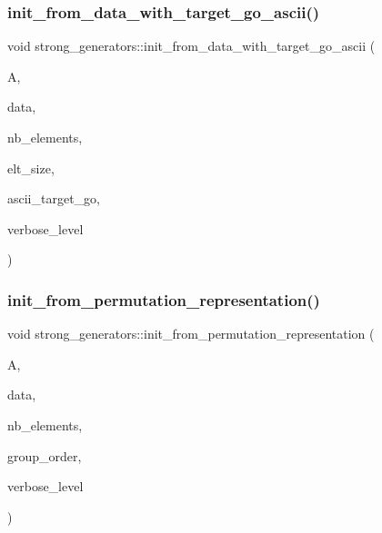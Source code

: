 \subsubsection{\texorpdfstring{init\+\_\+from\+\_\+data\+\_\+with\+\_\+target\+\_\+go\+\_\+ascii()}{init\_from\_data\_with\_target\_go\_ascii()}}
{\footnotesize\ttfamily void strong\+\_\+generators\+::init\+\_\+from\+\_\+data\+\_\+with\+\_\+target\+\_\+go\+\_\+ascii (\begin{DoxyParamCaption}\item[{\mbox{\hyperlink{classaction}{action}} $\ast$}]{A,  }\item[{\mbox{\hyperlink{galois_8h_a09fddde158a3a20bd2dcadb609de11dc}{I\+NT}} $\ast$}]{data,  }\item[{\mbox{\hyperlink{galois_8h_a09fddde158a3a20bd2dcadb609de11dc}{I\+NT}}}]{nb\+\_\+elements,  }\item[{\mbox{\hyperlink{galois_8h_a09fddde158a3a20bd2dcadb609de11dc}{I\+NT}}}]{elt\+\_\+size,  }\item[{const \mbox{\hyperlink{galois_8h_ab6cc7b4aeb6ea31aba2b3fbfc83ff5e6}{B\+Y\+TE}} $\ast$}]{ascii\+\_\+target\+\_\+go,  }\item[{\mbox{\hyperlink{galois_8h_a09fddde158a3a20bd2dcadb609de11dc}{I\+NT}}}]{verbose\+\_\+level }\end{DoxyParamCaption})}

\mbox{\label{classstrong__generators_a709dd6fd8aed3f80b1f9873753132bc4}} 
\subsubsection{\texorpdfstring{init\+\_\+from\+\_\+permutation\+\_\+representation()}{init\_from\_permutation\_representation()}}
{\footnotesize\ttfamily void strong\+\_\+generators\+::init\+\_\+from\+\_\+permutation\+\_\+representation (\begin{DoxyParamCaption}\item[{\mbox{\hyperlink{classaction}{action}} $\ast$}]{A,  }\item[{\mbox{\hyperlink{galois_8h_a09fddde158a3a20bd2dcadb609de11dc}{I\+NT}} $\ast$}]{data,  }\item[{\mbox{\hyperlink{galois_8h_a09fddde158a3a20bd2dcadb609de11dc}{I\+NT}}}]{nb\+\_\+elements,  }\item[{\mbox{\hyperlink{galois_8h_a09fddde158a3a20bd2dcadb609de11dc}{I\+NT}}}]{group\+\_\+order,  }\item[{\mbox{\hyperlink{galois_8h_a09fddde158a3a20bd2dcadb609de11dc}{I\+NT}}}]{verbose\+\_\+level }\end{DoxyParamCaption})}

